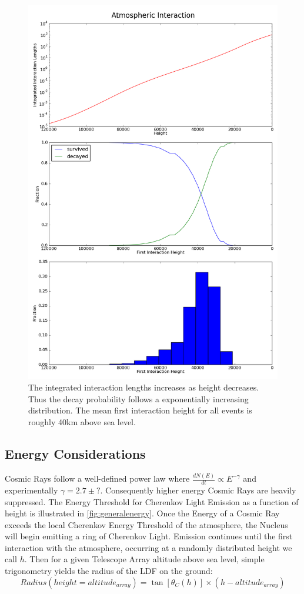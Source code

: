 \documentclass{article}
\begin{document}
\begin{figure}
\begin{center}
\includegraphics[height=0.9\textheight]{generalheight}
\caption{The integrated interaction lengths increases as height decreases. Thus the decay probability follows a exponentially increasing distribution. The mean first interaction height for all events is roughly 40km above sea level.}
\label{fig:generalheight}
\end{center}
\end{figure}

\subsection{Energy Considerations}
Cosmic Rays follow a well-defined power law where $ \frac{dN(E)}{dt} \propto E^{-\gamma} $ and experimentally $ \gamma = 2.7 \pm ? $. Consequently higher energy Cosmic Rays are heavily suppressed. The Energy Threshold for Cherenkov Light Emission as a function of height is illustrated in \ref{fig:generalenergy}. Once the Energy of a Cosmic Ray exceeds the local Cherenkov Energy Threshold of the atmosphere, the Nucleus will begin emitting a ring of Cherenkov Light. Emission continues until the first interaction with the atmosphere, occurring at a randomly distributed height we call $h$. Then for a given Telescope Array altitude above sea level, simple trigonometry yields the radius of the LDF on the ground:
\[ Radius(height = altitude_{array}) = \tan [\theta_{C}(h)] \times (h - altitude_{array})\]
\end{document}
